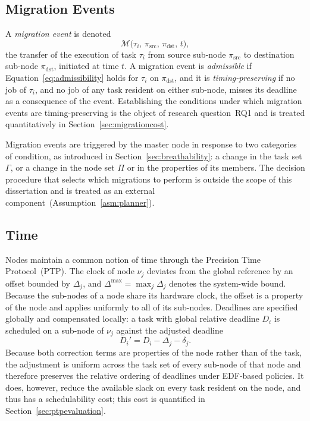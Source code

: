 \subsection{Migration Events}\label{subsec:migrationmodel}

A \emph{migration event} is denoted
%
\begin{equation}
	\mathcal{M}\bigl(\tau_i,\, \pi_{\mathrm{src}},\, \pi_{\mathrm{dst}},\, t\bigr),
\end{equation}
%
the transfer of the execution of task $\tau_i$ from source sub-node
$\pi_{\mathrm{src}}$ to destination sub-node $\pi_{\mathrm{dst}}$, initiated
at time $t$. A migration event is \emph{admissible} if
Equation~\ref{eq:admissibility} holds for $\tau_i$ on $\pi_{\mathrm{dst}}$,
and it is \emph{timing-preserving} if no job of $\tau_i$, and no job of any
task resident on either sub-node, misses its deadline as a consequence of the
event. Establishing the conditions under which migration events are
timing-preserving is the object of research question~RQ1 and is treated
quantitatively in Section~\ref{sec:migrationcost}.

Migration events are triggered by the master node in response to two
categories of condition, as introduced in
Section~\ref{sec:breathability}: a change in the task set $\Gamma$, or a
change in the node set $\Pi$ or in the properties of its members. The
decision procedure that selects which migrations to perform is outside the
scope of this dissertation and is treated as an external
component~(Assumption~\ref{asm:planner}).

\subsection{Time}\label{subsec:timemodel}

Nodes maintain a common notion of time through the Precision Time
Protocol~(PTP). The clock of node $\nu_j$ deviates from the global reference
by an offset bounded by $\Delta_j$, and $\Delta^{\max} = \max_j \Delta_j$
denotes the system-wide bound. Because the sub-nodes of a node share its
hardware clock, the offset is a property of the node and applies uniformly to
all of its sub-nodes. Deadlines are specified globally and compensated
locally: a task with global relative deadline $D_i$ is scheduled on a sub-node
of $\nu_j$ against the adjusted deadline
%
\begin{equation}\label{eq:deadlinecompensation}
	D_i' = D_i - \Delta_j - \delta_j .
\end{equation}
%
Because both correction terms are properties of the node rather than of the
task, the adjustment is uniform across the task set of every sub-node of that
node and therefore preserves the relative ordering of deadlines under
EDF-based policies. It
does, however, reduce the available slack on every task resident on the node,
and thus has a schedulability cost; this cost is quantified in
Section~\ref{sec:ptpevaluation}.

